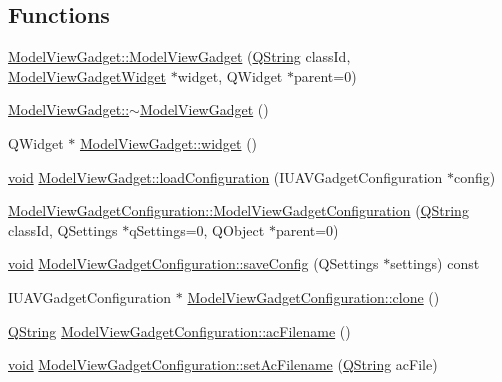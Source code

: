 \subsection*{\-Functions}
\begin{DoxyCompactItemize}
\item 
\hyperlink{group___model_view_plugin_ga411c180daebc524f226c60cef529bcd4}{\-Model\-View\-Gadget\-::\-Model\-View\-Gadget} (\hyperlink{group___u_a_v_objects_plugin_gab9d252f49c333c94a72f97ce3105a32d}{\-Q\-String} class\-Id, \hyperlink{class_model_view_gadget_widget}{\-Model\-View\-Gadget\-Widget} $\ast$widget, \-Q\-Widget $\ast$parent=0)
\item 
\hyperlink{group___model_view_plugin_ga0b914fe76448332e8f22649b75984f4d}{\-Model\-View\-Gadget\-::$\sim$\-Model\-View\-Gadget} ()
\item 
\-Q\-Widget $\ast$ \hyperlink{group___model_view_plugin_ga9240ecd7243b93f3188923a7a28926b1}{\-Model\-View\-Gadget\-::widget} ()
\item 
\hyperlink{group___u_a_v_objects_plugin_ga444cf2ff3f0ecbe028adce838d373f5c}{void} \hyperlink{group___model_view_plugin_gae2075c43d77a6afba12fa43cbda0af36}{\-Model\-View\-Gadget\-::load\-Configuration} (\-I\-U\-A\-V\-Gadget\-Configuration $\ast$config)
\item 
\hyperlink{group___model_view_plugin_ga68c5b45bcb3a5b4f35186957e765e343}{\-Model\-View\-Gadget\-Configuration\-::\-Model\-View\-Gadget\-Configuration} (\hyperlink{group___u_a_v_objects_plugin_gab9d252f49c333c94a72f97ce3105a32d}{\-Q\-String} class\-Id, \-Q\-Settings $\ast$q\-Settings=0, \-Q\-Object $\ast$parent=0)
\item 
\hyperlink{group___u_a_v_objects_plugin_ga444cf2ff3f0ecbe028adce838d373f5c}{void} \hyperlink{group___model_view_plugin_gaa2ed9dd347aecb4518cf716e3fbd9288}{\-Model\-View\-Gadget\-Configuration\-::save\-Config} (\-Q\-Settings $\ast$settings) const 
\item 
\-I\-U\-A\-V\-Gadget\-Configuration $\ast$ \hyperlink{group___model_view_plugin_gafe85c40e0602f4bb0a8f54637fd87b2c}{\-Model\-View\-Gadget\-Configuration\-::clone} ()
\item 
\hyperlink{group___u_a_v_objects_plugin_gab9d252f49c333c94a72f97ce3105a32d}{\-Q\-String} \hyperlink{group___model_view_plugin_ga38f0d11e16e59ffff87290b2a222468e}{\-Model\-View\-Gadget\-Configuration\-::ac\-Filename} ()
\item 
\hyperlink{group___u_a_v_objects_plugin_ga444cf2ff3f0ecbe028adce838d373f5c}{void} \hyperlink{group___model_view_plugin_ga5a6c75e6ec1963b48ad4cd6fd1f80e67}{\-Model\-View\-Gadget\-Configuration\-::set\-Ac\-Filename} (\hyperlink{group___u_a_v_objects_plugin_gab9d252f49c333c94a72f97ce3105a32d}{\-Q\-String} ac\-File)

\end{DoxyCompactItemize}
